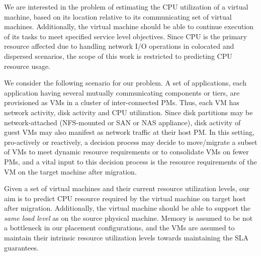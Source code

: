 
We are interested in the problem of estimating the %
CPU utilization of a virtual machine, based on its location relative
to its communicating set of virtual machines.
Additionally, the virtual machine should be
able to continue execution of its tasks to meet
specified service level objectives.
Since CPU is the primary resource affected due to handling network I/O
operations in colocated and dispersed scenarios, the scope of this work 
is restricted to predicting CPU resource usage.

We consider the following scenario for our problem.
A set of applications, each application having several mutually
communicating components or tiers, are
provisioned as VMs in a cluster of inter-connected PMs.
Thus, each VM has network activity, disk activity and CPU utilization. 
Since disk partitions may be 
network-attached (NFS-mounted or 
SAN or
NAS appliance), disk activity of
guest VMs may also manifest as network traffic at their host PM.
In this setting,
pro-actively or reactively, a decision process may decide
to move/migrate a subset of VMs to meet dynamic resource
requirements or to consolidate VMs on fewer PMs,
and a vital input to this decision process
is the resource requirements of the VM on the target machine
after migration.

Given a set of virtual machines and their current resource utilization 
levels, our aim is to predict CPU resource required by 
the virtual machine on target host after migration. Additionally,
the virtual machine should be able 
to support the \emph{same load level} as on the source physical machine.
Memory is assumed to be not a bottleneck in our placement configurations,
and the VMs are assumed to maintain their intrinsic resource
utilization levels towards maintaining the SLA guarantees.

